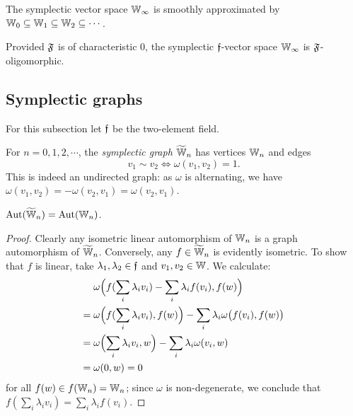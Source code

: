 \begin{theorem}\label{thm:symplectic-smooth-approximation}
    The symplectic vector space $\mathbb{W}_\infty$ is smoothly approximated by 
    $\mathbb{W}_0 \subseteq \mathbb{W}_1 \subseteq \mathbb{W}_2 \subseteq \cdots$.
\end{theorem}

\begin{corollary}
    Provided $\mathfrak{F}$ is of characteristic $0$, the symplectic $\mathfrak{f}$-vector space $\mathbb{W}_\infty$ is $\mathfrak{F}$-oligomorphic.
\end{corollary}




\subsection{Symplectic graphs}
For this subsection let $\mathfrak{f}$ be the two-element field.
\begin{definition}
    For $n = 0, 1, 2, \cdots$, the \emph{symplectic graph} $\widetilde {\mathbb{W}}_n$ has vertices $\mathbb{W}_n$ and edges
    \[
        v_1 \sim v_2 \iff \omega(v_1, v_2) = 1.
    \]
    This is indeed an undirected graph: as $\omega$ is alternating, we have $\omega(v_1, v_2) = -\omega(v_2, v_1) = \omega(v_2, v_1)$.    
\end{definition}

\begin{proposition}\label{prop:symplectic-vs-graph}
    $\operatorname{Aut}(\widetilde {\mathbb{W}}_n) = \operatorname{Aut}(\mathbb{W}_n)$.
\end{proposition}
\begin{proof}
    Clearly any isometric linear automorphism of $\mathbb{W}_n$ is a graph automorphism of $\widetilde {\mathbb{W}}_n$.
    Conversely, any $f \in \widetilde {\mathbb{W}}_n$ is evidently isometric.
    To show that $f$ is linear, take $\lambda_1, \lambda_2 \in \mathfrak{f}$ and $v_1, v_2 \in \mathbb{W}$.
    We calculate:
    \begin{align*}
        &\omega\Bigl( f(\sum_i \lambda_i v_i) - \sum_i \lambda_i f(v_i) , f(w) \Bigr) \\
        ={}& \omega\Bigl( f(\sum_i \lambda_i v_i), f(w)\Bigr) - \sum_i \lambda_i \omega\bigl(f(v_i), f(w) \bigr) \\
        ={}& \omega\Bigl( \sum_i \lambda_i v_i, w \Bigr) - \sum_i \lambda_i \omega( v_i, w ) \\
        ={}& \omega(0, w) = 0
    \end{align*}
    for all $f(w) \in f(\mathbb{W}_n) = \mathbb{W}_n$;
    since $\omega$ is non-degenerate, 
    we conclude that $f(\sum_i \lambda_i v_i) = \sum_i \lambda_i f(v_i)$.
\end{proof}

